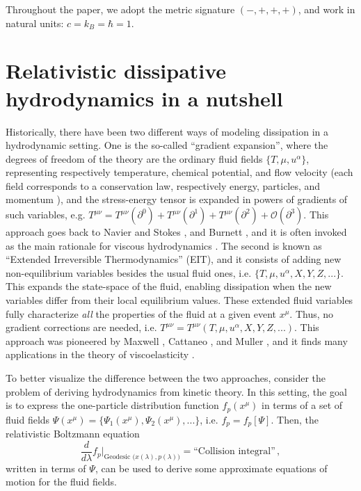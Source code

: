 \documentclass[a4paper, amsfonts, amssymb, amsmath, reprint, showkeys, nofootinbib, twoside, onecolumn, notitlepage]{revtex4-1}
\begin{document}
Throughout the paper, we adopt the metric signature $(-,+,+,+)$, and work in natural units: $c=k_B=\hbar=1$.

\section{Relativistic dissipative hydrodynamics in a nutshell}\label{nutshell}

Historically, there have been two different ways of modeling dissipation in a hydrodynamic setting. One is the so-called ``gradient expansion'', where the degrees of freedom of the theory are the ordinary fluid fields $\{T,\mu,u^\alpha\}$, representing respectively temperature, chemical potential, and flow velocity (each field corresponds to a conservation law, respectively energy, particles, and momentum \cite{kovtun_lectures_2012,Glorioso2018}), and the stress-energy tensor is expanded in powers of gradients of such variables, e.g. $T^{\mu \nu}=T^{\mu \nu}(\partial^0)+T^{\mu \nu}(\partial^1)+T^{\mu \nu}(\partial^2)+\mathcal{O}(\partial^3)$. This approach goes back to Navier and Stokes \cite{landau6}, and Burnett \cite{Agrawal2020}, and it is often invoked as the main rationale for viscous hydrodynamics \cite{Baier2008,Romatschke2017,FlorkowskiReview2018}. The second is known as ``Extended Irreversible Thermodynamics'' \cite{Jou_Extended} (EIT), and it consists of adding new non-equilibrium variables besides the usual fluid ones, i.e. $\{T,\mu,u^\alpha,X,Y,Z,...\}$. This expands the state-space of the fluid, enabling dissipation when the new variables differ from their local equilibrium values. These extended fluid variables fully characterize \textit{all} the properties of the fluid at a given event $x^\mu$. Thus, no gradient corrections are needed, i.e. $T^{\mu \nu}=T^{\mu \nu}(T,\mu,u^\alpha,X,Y,Z,...)$. This approach was pioneered by Maxwell \cite{Roylance2001}, Cattaneo \cite{cattaneo1958}, and Muller \cite{Muller_book}, and it finds many applications in the theory of viscoelasticity \cite{Frenkel_book,landau7,FindleyBook,Steffe_book,BAGGIOLI20201}.

To better visualize the difference between the two approaches, consider the problem of deriving hydrodynamics from kinetic theory. In this setting, the goal is to express the one-particle distribution function $f_p(x^\mu)$ in terms of a set of fluid fields $\Psi(x^\mu)=\{\Psi_1(x^\mu),\Psi_2(x^\mu),...\}$, i.e. $f_p=f_p[\Psi]$. Then, the relativistic Boltzmann equation \cite{MTW_book,cercignani_book}
\begin{equation}\label{boltzuz}
    \dfrac{d}{d\lambda} f_p \bigg|_{\text{Geodesic }\big(x(\lambda),p(\lambda) \big)} = \text{``Collision integral''} \, ,
\end{equation}
written in terms of $\Psi$, can be used to derive some approximate equations of motion for the fluid fields. 
\end{document}
